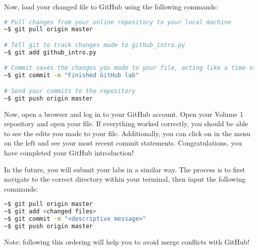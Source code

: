 Now, load your changed file to GitHub using the following commands:

\begin{lstlisting}[language=bash]
# Pull changes from your online repository to your local machine
~$ git pull origin master

# Tell git to track changes made to github_intro.py
~$ git add github_intro.py

# Commit saves the changes you made to your file, acting like a time stamp
~$ git commit -m "Finished GitHub lab"

# Send your commits to the repository
~$ git push origin master
\end{lstlisting}

Now, open a browser and log in to your GitHub account.
Open your Volume 1 repository and open your  file.
If everything worked correctly, you should be able to see the edits you made to your file.
Additionally, you can click on  in the menu on the left and see your most recent commit statements.
Congratulations, you have completed your GitHub introduction!

In the future, you will submit your labs in a similar way.
The process is to first navigate to the correct directory within your terminal, then input the following commands:

\begin{lstlisting}[language=bash]
~$ git pull origin master
~$ git add <changed files>
~$ git commit -m "<descriptive message>"
~$ git push origin master
\end{lstlisting}

Note: following this ordering will help you to avoid merge conflicts with GitHub!

